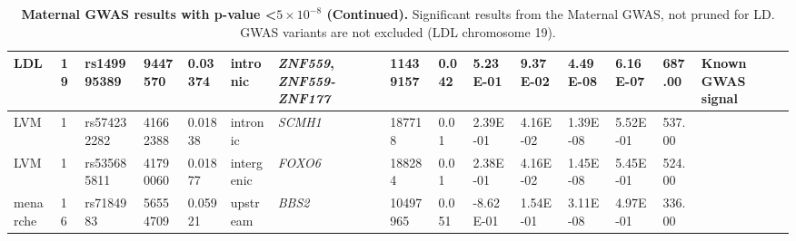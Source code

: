 \begin{landscape}
\begin{table}
\begin{adjustbox}{max width=\linewidth}
\begin{tabular}{@{}p{2cm}|p{0.5cm}p{2cm}p{2cm}p{1.5cm}p{3cm}p{2.5cm}p{1.5cm}p{1cm}p{2cm}p{2cm}p{2cm}p{2cm}p{1.5cm}p{4cm}@{}}
LDL&19&rs149995389&9447570&0.03374&intronic&\emph{ZNF559}, \emph{ZNF559-ZNF177}&11439157&0.042&5.23E-01&9.37E-02&4.49E-08&6.16E-07&687.00&Known GWAS signal\\ \hline
LVM&1&rs574232282&41662388&0.01838&intronic&\emph{SCMH1}&187718&0.01&2.39E-01&4.16E-02&1.39E-08&5.52E-01&537.00&\\ \hline
LVM&1&rs535685811&41790060&0.01877&intergenic&\emph{FOXO6}&188284&0.01&2.38E-01&4.16E-02&1.45E-08&5.45E-01&524.00&\\ \hline
menarche&16&rs7184983&56554709&0.05921&upstream&\emph{BBS2}&10497965&0.051&-8.62E-01&1.54E-01&3.11E-08&4.97E-01&336.00&\\ \bottomrule
\end{tabular}
\end{adjustbox}
\caption[]{\textbf{Maternal GWAS results with p-value \textless $5 \times 10^{-8}$ (Continued).} Significant results from the Maternal GWAS, not pruned for LD. GWAS variants are not excluded (LDL chromosome 19).  }
\label{tab:tab-s5b}
\end{table}





\end{landscape}
